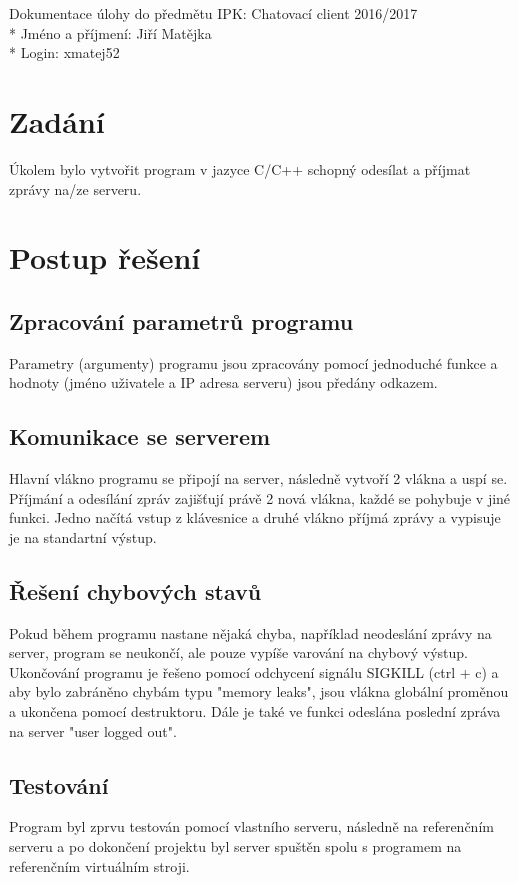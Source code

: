 \documentclass[a4paper, 10pt]{article}
\begin{document}
    \noindent
    Dokumentace úlohy do předmětu IPK: Chatovací client 2016/2017 \\*
    Jméno a příjmení: Jiří Matějka \\*
    Login: xmatej52

    \section{Zadání}
        Úkolem bylo vytvořit program v jazyce C/C++ schopný odesílat a příjmat
        zprávy na/ze serveru.
    \section{Postup řešení}
        \subsection{Zpracování parametrů programu}
            Parametry (argumenty) programu jsou zpracovány pomocí jednoduché funkce
            a hodnoty (jméno uživatele a IP adresa serveru) jsou předány odkazem.
        \subsection{Komunikace se serverem}
            Hlavní vlákno programu se připojí na server, následně vytvoří 2 vlákna
            a uspí se. Příjmání a odesílání zpráv zajišťují právě 2 nová vlákna,
            každé se pohybuje v jiné funkci. Jedno načítá vstup z klávesnice
            a druhé vlákno příjmá zprávy a vypisuje je na standartní výstup.
        \subsection{Řešení chybových stavů}
            Pokud během programu nastane nějaká chyba, například neodeslání zprávy
            na server, program se neukončí, ale pouze vypíše varování na chybový
            výstup. Ukončování programu je řešeno pomocí odchycení signálu
            SIGKILL (ctrl + c) a aby bylo zabráněno chybám typu "memory leaks",
            jsou vlákna globální proměnou a ukončena pomocí destruktoru. Dále
            je také ve funkci odeslána poslední zpráva na server "user logged out".
        \subsection{Testování}
            Program byl zprvu testován pomocí vlastního serveru,
            následně na referenčním serveru a po dokončení projektu byl server
            spuštěn spolu s programem na referenčním virtuálním stroji.
\end{document}
